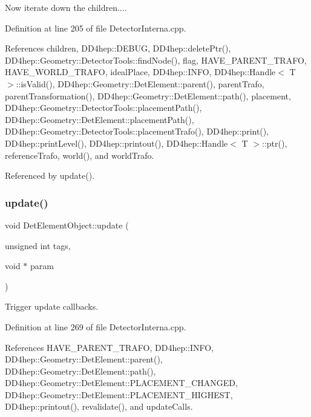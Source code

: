 Now iterate down the children.... 

Definition at line 205 of file Detector\+Interna.\+cpp.



References children, D\+D4hep\+::\+D\+E\+B\+UG, D\+D4hep\+::delete\+Ptr(), D\+D4hep\+::\+Geometry\+::\+Detector\+Tools\+::find\+Node(), flag, H\+A\+V\+E\+\_\+\+P\+A\+R\+E\+N\+T\+\_\+\+T\+R\+A\+FO, H\+A\+V\+E\+\_\+\+W\+O\+R\+L\+D\+\_\+\+T\+R\+A\+FO, ideal\+Place, D\+D4hep\+::\+I\+N\+FO, D\+D4hep\+::\+Handle$<$ T $>$\+::is\+Valid(), D\+D4hep\+::\+Geometry\+::\+Det\+Element\+::parent(), parent\+Trafo, parent\+Transformation(), D\+D4hep\+::\+Geometry\+::\+Det\+Element\+::path(), placement, D\+D4hep\+::\+Geometry\+::\+Detector\+Tools\+::placement\+Path(), D\+D4hep\+::\+Geometry\+::\+Det\+Element\+::placement\+Path(), D\+D4hep\+::\+Geometry\+::\+Detector\+Tools\+::placement\+Trafo(), D\+D4hep\+::print(), D\+D4hep\+::print\+Level(), D\+D4hep\+::printout(), D\+D4hep\+::\+Handle$<$ T $>$\+::ptr(), reference\+Trafo, world(), and world\+Trafo.



Referenced by update().

\hypertarget{class_d_d4hep_1_1_geometry_1_1_det_element_object_a826e6ef5e3869b55970bd7c74f57b3a1}{}\label{class_d_d4hep_1_1_geometry_1_1_det_element_object_a826e6ef5e3869b55970bd7c74f57b3a1} 
\subsubsection{\texorpdfstring{update()}{update()}}
{\footnotesize\ttfamily void Det\+Element\+Object\+::update (\begin{DoxyParamCaption}\item[{unsigned int}]{tags,  }\item[{void $\ast$}]{param }\end{DoxyParamCaption})}



Trigger update callbacks. 



Definition at line 269 of file Detector\+Interna.\+cpp.



References H\+A\+V\+E\+\_\+\+P\+A\+R\+E\+N\+T\+\_\+\+T\+R\+A\+FO, D\+D4hep\+::\+I\+N\+FO, D\+D4hep\+::\+Geometry\+::\+Det\+Element\+::parent(), D\+D4hep\+::\+Geometry\+::\+Det\+Element\+::path(), D\+D4hep\+::\+Geometry\+::\+Det\+Element\+::\+P\+L\+A\+C\+E\+M\+E\+N\+T\+\_\+\+C\+H\+A\+N\+G\+ED, D\+D4hep\+::\+Geometry\+::\+Det\+Element\+::\+P\+L\+A\+C\+E\+M\+E\+N\+T\+\_\+\+H\+I\+G\+H\+E\+ST, D\+D4hep\+::printout(), revalidate(), and update\+Calls.

